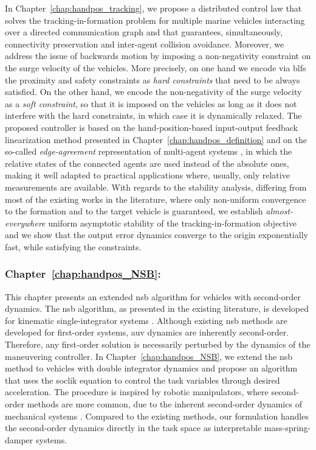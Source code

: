 In Chapter~\ref{chap:handpos_tracking}, we propose a distributed control law that solves the tracking-in-formation problem for multiple marine vehicles interacting over a directed communication graph and that guarantees, simultaneously, connectivity preservation and inter-agent collision avoidance.
Moreover, we address the issue of backwards motion by imposing a non-negativity constraint on the surge velocity of the vehicles.
More precisely, on one hand we encode via \glspl{blf} the proximity and safety constraints as \emph{hard constraints} that need to be always satisfied.
On the other hand, we encode the non-negativity of the surge velocity as a \emph{soft constraint}, so that it is imposed on the vehicles as long as it does not interfere with the hard constraints, in which case it is dynamically relaxed.
The proposed controller is based on the hand-position-based input-output feedback linearization method presented in Chapter~\ref{chap:handpos_definition} and on the so-called \emph{edge-agreement} representation of multi-agent systems \cite{mesbahi_graph_2010}, in which the relative states of the connected agents are used instead of the absolute ones, making it well adapted to practical applications where, usually, only relative measurements are available.
With regards to the stability analysis, differing from most of the existing works in the literature, where only non-uniform convergence to the formation and to the target vehicle is guaranteed, we establish \emph{almost-everywhere} uniform asymptotic stability of the tracking-in-formation objective and we show that the output error dynamics converge to the origin exponentially fast, while satisfying the constraints.

\subsubsection{Chapter~\ref{chap:handpos_NSB}: }

This chapter presents an extended \acrfull{nsb} algorithm for vehicles with second-order dynamics.
The \gls{nsb} algorithm, as presented in the existing literature, is developed for kinematic single-integrator systems \cite{arrichiello_formation_2006,matous_singularity_2023,eek_formation_2021}.
Although existing \gls{nsb} methods are developed for first-order systems, \gls{auv} dynamics are inherently second-order. Therefore, any first-order solution is necessarily perturbed by the dynamics of the maneuvering controller.
In Chapter~\ref{chap:handpos_NSB}, we extend the \gls{nsb} method to vehicles with double integrator dynamics and propose an algorithm that uses the \acrlong{soclik} equation to control the task variables through desired acceleration. The procedure is inspired by robotic manipulators, where second-order methods are more common, due to the inherent second-order dynamics of mechanical systems \cite{siciliano_differential_2009, chiaverini_kinematically_2008}. Compared to the existing methods, our formulation handles the second-order dynamics directly in the task space as interpretable mass-spring-damper systems.

